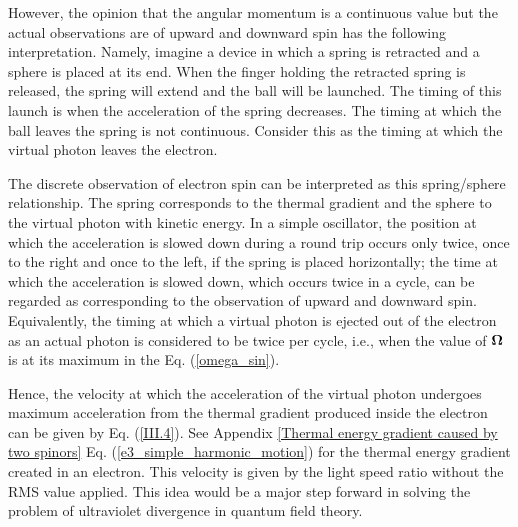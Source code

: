 \documentclass[%
 reprint,
 amsmath,amssymb,
 aps,
]{revtex4-1}
\numberwithin{equation}{section}%
\begin{document}



However, the opinion that the angular momentum is a continuous value but the actual observations are of upward and downward spin has the following interpretation. Namely, imagine a device in which a spring is retracted and a sphere is placed at its end. When the finger holding the retracted spring is released, the spring will extend and the ball will be launched. The timing of this launch is when the acceleration of the spring decreases. The timing at which the ball leaves the spring is not continuous. Consider this as the timing at which the virtual photon leaves the electron.

The discrete observation of electron spin can be interpreted as this spring/sphere relationship. The spring corresponds to the thermal gradient and the sphere to the virtual photon with kinetic energy. In a simple oscillator, the position at which the acceleration is slowed down during a round trip occurs only twice, once to the right and once to the left, if the spring is placed horizontally; the time at which the acceleration is slowed down, which occurs twice in a cycle, can be regarded as corresponding to the observation of upward and downward spin. Equivalently, the timing at which a virtual photon is ejected out of the electron as an actual photon is considered to be twice per cycle, i.e., when the value of ${\bf \Omega}$ is at its maximum in the Eq. (\ref{omega_sin}).

Hence, the velocity at which the acceleration of the virtual photon undergoes maximum acceleration from the thermal gradient produced inside the electron can be given by Eq. (\ref{III.4}). See Appendix \ref{Thermal energy gradient caused by two spinors} Eq. (\ref{e3_simple_harmonic_motion}) for the thermal energy gradient created in an electron. This velocity is given by the light speed ratio without the RMS value applied. This idea would be a major step forward in solving the problem of ultraviolet divergence in quantum field theory.
\end{document}
